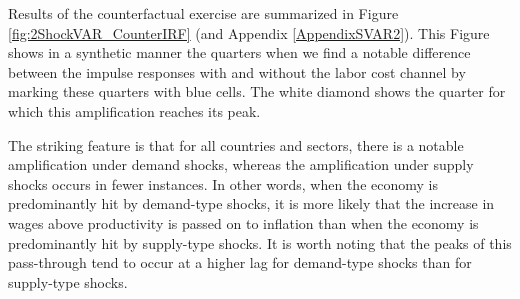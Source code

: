 \documentclass[11pt]{article}
\begin{document}

Results of the counterfactual exercise are summarized in Figure \ref{fig:2ShockVAR_CounterIRF} (and Appendix \ref{AppendixSVAR2}). This Figure shows in a synthetic manner the quarters when we find a notable difference between the impulse responses with and without the labor cost channel by marking these quarters with blue cells. The white diamond shows the quarter for which this amplification reaches its peak. 

The striking feature is that for all countries and sectors, there is a notable amplification under demand shocks, whereas the amplification under supply shocks occurs in fewer instances. In other words, when the economy is predominantly hit by demand-type shocks, it is more likely that the increase in wages above productivity is passed on to inflation than when the economy is predominantly hit by supply-type shocks. It is worth noting that the peaks of this pass-through tend to occur at a higher lag for demand-type shocks than for supply-type shocks.
\end{document}
